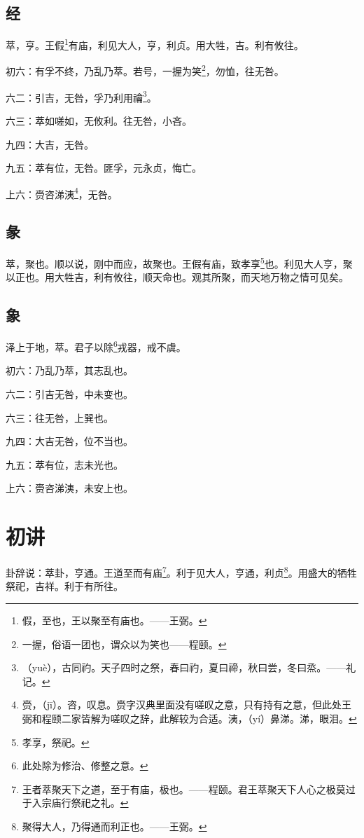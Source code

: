 \documentclass[12pt,oneside]{book}
\begin{document}
\subsection{经}
萃，亨。王假\footnote{假，至也，王以聚至有庙也。——王弼。}有庙，利见大人，亨，利贞。用大牲，吉。利有攸往。

初六：有孚不终，乃乱乃萃。若号，一握为笑\footnote{一握，俗语一团也，谓众以为笑也——程颐。}，勿恤，往无咎。

六二：引吉，无咎，孚乃利用禴\footnote{（yuè），古同礿。天子四时之祭，春曰礿，夏曰禘，秋曰尝，冬曰烝。——礼记。}。

六三：萃如嗟如，无攸利。往无咎，小吝。

九四：大吉，无咎。

九五：萃有位，无咎。匪孚，元永贞，悔亡。

上六：赍咨涕洟\footnote{赍，（jī）。咨，叹息。赍字汉典里面没有嗟叹之意，只有持有之意，但此处王弼和程颐二家皆解为嗟叹之辞，此解较为合适。洟，（yí）鼻涕。涕，眼泪。}，无咎。

\subsection{彖}
萃，聚也。顺以说，刚中而应，故聚也。王假有庙，致孝享\footnote{孝享，祭祀。}也。利见大人亨，聚以正也。用大牲吉，利有攸往，顺天命也。观其所聚，而天地万物之情可见矣。

\subsection{象}
泽上于地，萃。君子以除\footnote{此处除为修治、修整之意。}戎器，戒不虞。

初六：乃乱乃萃，其志乱也。

六二：引吉无咎，中未变也。

六三：往无咎，上巽也。

九四：大吉无咎，位不当也。

九五：萃有位，志未光也。

上六：赍咨涕洟，未安上也。

\section{初讲}
卦辞说：萃卦，亨通。王道至而有庙\footnote{王者萃聚天下之道，至于有庙，极也。——程颐。君王萃聚天下人心之极莫过于入宗庙行祭祀之礼。}。利于见大人，亨通，利贞\footnote{聚得大人，乃得通而利正也。——王弼。}。用盛大的牺牲祭祀，吉祥。利于有所往。
\end{document}
